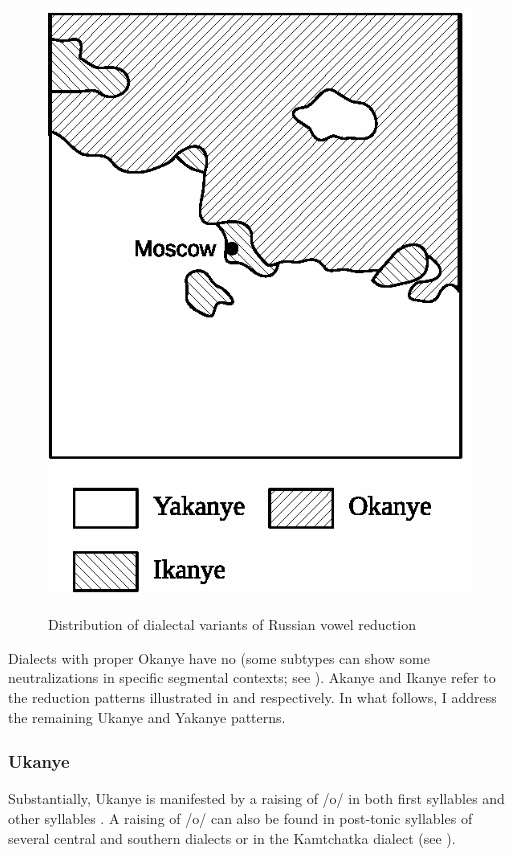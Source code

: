 \documentclass[output=paper,modfonts,newtxmath,hidelinks,]{langscibook}
\begin{document}
\begin{figure}
{\includegraphics[height=0.3\textheight]{figures/05enguehard_f2.eps}
}
\caption{Distribution of dialectal variants of Russian vowel reduction}\label{5:f1}
\end{figure}

Dialects with proper Okanye have no  (some subtypes can show some neutralizations in specific segmental contexts; see \citealt[§46, §56]{Avanesov1949}). Akanye and Ikanye refer to the reduction patterns illustrated in  and  respectively. In what follows, I address the remaining Ukanye and Yakanye patterns.

\subsubsection{Ukanye}\label{5:s2.3.1}

Substantially, Ukanye is manifested by a raising of /o/ in both first  syllables  and other  syllables . A raising of /o/ can also be found in post-tonic syllables of several central and southern dialects \citep[§104]{Avanesov1949} or in the Kamtchatka dialect (see \citealt[40]{Gluschenko2007}).
\end{document}
